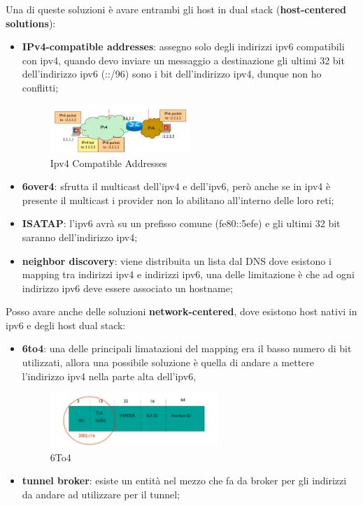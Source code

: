 \documentclass[12pt]{article}
\begin{document}
Una di queste soluzioni \`e avare entrambi gli host in dual stack (\textbf{host-centered solutions}):
\begin{itemize}
    \item \textbf{IPv4-compatible addresses}: assegno solo degli indirizzi ipv6 compatibili con ipv4, quando devo inviare un messaggio a destinazione gli ultimi 32 bit dell'indirizzo ipv6 (::/96) sono i bit dell'indirizzo ipv4, dunque non ho conflitti;
        \begin{figure}[H]
            \centering
            \includegraphics[width=0.5\textwidth]{ipv4-compatible-addresses.png}
            \caption{Ipv4 Compatible Addresses}
            \label{fig:ipv4-compatible-addresses}
        \end{figure}
    \item \textbf{6over4}: sfrutta il multicast dell'ipv4 e dell'ipv6, per\`o anche se in ipv4 \`e presente il multicast i provider non lo abilitano all'interno delle loro reti;
    \item \textbf{ISATAP}: l'ipv6 avr\`a su un prefisso comune (fe80::5efe) e gli ultimi 32 bit saranno dell'indirizzo ipv4;
    \item \textbf{neighbor discovery}: viene distribuita un lista dal DNS dove esistono i mapping tra indirizzi ipv4 e indirizzi ipv6, una delle limitazione \`e che ad ogni indirizzo ipv6 deve essere associato un hostname;
\end{itemize}

Posso avare anche delle soluzioni \textbf{network-centered}, dove esistono host nativi in ipv6 e degli host dual stack:
\begin{itemize}
    \item \textbf{6to4}: una delle principali limatazioni del mapping era il basso numero di bit utilizzati, allora una possibile soluzione \`e quella di andare a mettere l'indirizzo ipv4 nella parte alta dell'ipv6,
        \begin{figure}[H]
            \centering
            \includegraphics[width=0.6\textwidth]{6to4.png}
            \caption{6To4}
            \label{fig:6to4}
        \end{figure}
    \item \textbf{tunnel broker}: esiste un entit\`a nel mezzo che fa da broker per gli indirizzi da andare ad utilizzare per il tunnel;
\end{itemize}
\end{document}
